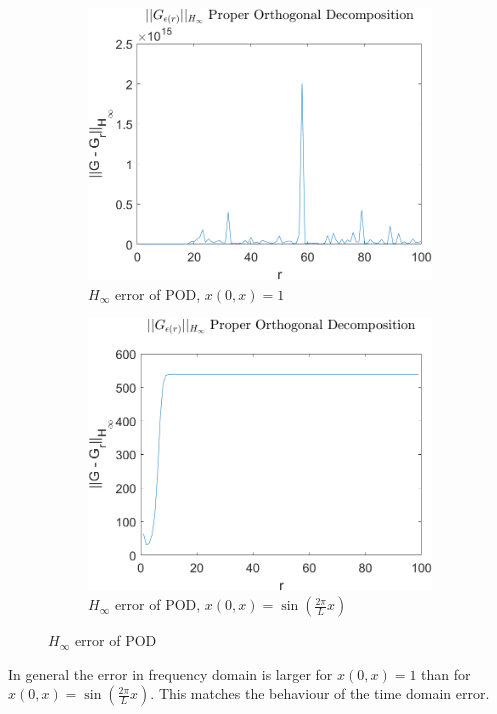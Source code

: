 \begin{figure}[H]
\begin{subfigure}[b]{0.5\textwidth}
\centering
\includegraphics[width=\textwidth]{images/freq/H_POD}
\caption{$H_{\infty}$ error of POD, $x(0, x) = 1$}
\label{FIG-H-POD}
\end{subfigure}
\begin{subfigure}[b]{0.5\textwidth}
\centering
\includegraphics[width=\textwidth]{images/freq/H_POD_SIN}
\caption{$H_{\infty}$ error of POD, $x(0, x) =  \sin(\frac{2\pi}{L}x)$}
\label{FIG-H-POD-SIN}
\end{subfigure}
\caption{$H_{\infty}$ error of POD}
\label{FIG-H-POD-1}
\end{figure}
In general the error in frequency domain is larger for \(x(0, x) = 1\) than for \(x(0, x) =  \sin(\frac{2\pi}{L}x)\). 
This matches the behaviour of the time domain error.

